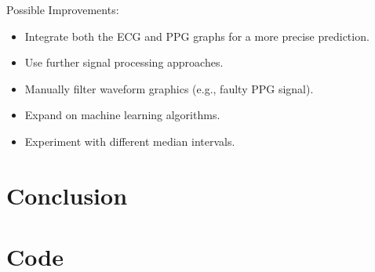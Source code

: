 \documentclass[12pt, bibliography=totoc]{scrartcl}
\begin{document}
    Possible Improvements:
    \begin{itemize}
        \item Integrate both the ECG and PPG graphs for a more precise prediction.
        \item Use further signal processing approaches.
        \item Manually filter waveform graphics (e.g., faulty PPG signal).
        \item Expand on machine learning algorithms.
        \item Experiment with different median intervals.
    \end{itemize}


    \section{Conclusion}
    \label{sec:conclusion}

    \newpage

    

    \newpage
    \appendix


    \section{Code}\label{sec:code}
    
\end{document}
